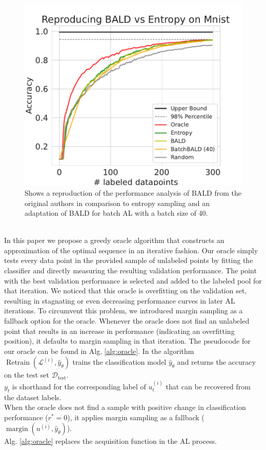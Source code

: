 \documentclass[]{article}
\begin{document}
\begin{minipage}{0.5\linewidth}
	\begin{figure}[H]
		\includegraphics[width=\linewidth]{img/ablation_bald}
		\caption{Shows a reproduction of the performance analysis of BALD from the original authors \cite{gal2017deep} in comparison to entropy sampling and an adaptation of BALD for batch AL \cite{kirsch2019batchbald} with a batch size of 40.}
		\label{fig:ablation_bald}
	\end{figure}
\end{minipage} \\[2mm]
In this paper we propose a greedy oracle algorithm that constructs an approximation of the optimal sequence in an iterative fashion.
Our oracle simply tests every data point in the provided sample of unlabeled points by fitting the classifier and directly measuring the resulting validation performance.
The point with the best validation performance is selected and added to the labeled pool for that iteration.
We noticed that this oracle is overfitting on the validation set, resulting in stagnating or even decreasing performance curves in later AL iterations.
To circumvent this problem, we introduced margin sampling as a fallback option for the oracle.
Whenever the oracle does not find an unlabeled point that results in an increase in performance (indicating an overfitting position), it defaults to margin sampling in that iteration.
The pseudocode for our oracle can be found in Alg. \ref{alg:oracle}.
In the algorithm $\operatorname{Retrain}(\mathcal{L}^{(i)}, \hat y_\theta)$ trains the classification model $\hat y_\theta$ and returns the accuracy on the test set $\mathcal{D}_\text{test}$. \\ 
$y_t$ is shorthand for the corresponding label of $u^{(i)}_{t}$ that can be recovered from the dataset labels. \\
When the oracle does not find a sample with positive change in classification performance ($r^* = 0$), it applies margin sampling as a fallback ($\operatorname{margin}(u^{(i)}, \hat y_\theta)$). \\
Alg. \ref{alg:oracle} replaces the acquisition function in the AL process.
\end{document}
